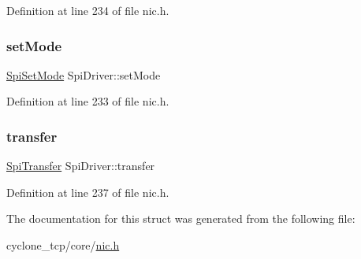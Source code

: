 Definition at line 234 of file nic.\+h.

\mbox{\label{structSpiDriver_aa3a63d109bce9213ccfeb8c0c0c286af}} 
\subsubsection{\texorpdfstring{set\+Mode}{setMode}}
{\footnotesize\ttfamily \hyperlink{nic_8h_adf96940921e97bad16877a29ee08b7ba}{Spi\+Set\+Mode} Spi\+Driver\+::set\+Mode}



Definition at line 233 of file nic.\+h.

\mbox{\label{structSpiDriver_aa74fa5d2edab78a2ff616ca3297ee372}} 
\subsubsection{\texorpdfstring{transfer}{transfer}}
{\footnotesize\ttfamily \hyperlink{nic_8h_a9563443a6b4fdbea93e0ba3c607ef4c2}{Spi\+Transfer} Spi\+Driver\+::transfer}



Definition at line 237 of file nic.\+h.



The documentation for this struct was generated from the following file\+:\begin{DoxyCompactItemize}
\item 
cyclone\+\_\+tcp/core/\hyperlink{nic_8h}{nic.\+h}\end{DoxyCompactItemize}
